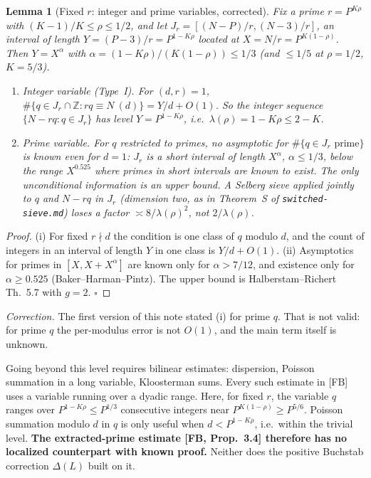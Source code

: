 \documentclass[11pt,a4paper]{article}
\newtheorem{lemma}[proposition]{Lemma}
\theoremstyle{remark}
\begin{document}
\begin{lemma}[Fixed $r$: integer and prime variables, corrected]
Fix a prime $r=P^{K\rho}$ with $(K-1)/K\le\rho\le1/2$, and let $J_r=[(N-P)/r,(N-3)/r]$, an interval of
length $Y=(P-3)/r=P^{1-K\rho}$ located at $X=N/r=P^{K(1-\rho)}$. Then $Y=X^{\alpha}$ with
$\alpha=(1-K\rho)/(K(1-\rho))\le1/3$ (and $\le 1/5$ at $\rho=1/2$, $K=5/3$).
\begin{enumerate}
\item[(i)] \emph{Integer variable (Type~I).} For $(d,r)=1$,
$\#\{q\in J_r\cap\mathbb Z: rq\equiv N\ (d)\}=Y/d+O(1)$. So the integer sequence $\{N-rq: q\in J_r\}$ has
level $Y=P^{1-K\rho}$, i.e.\ $\lambda(\rho)=1-K\rho\le2-K$.
\item[(ii)] \emph{Prime variable.} For $q$ restricted to primes, no asymptotic for
$\#\{q\in J_r \text{ prime}\}$ is known even for $d=1$: $J_r$ is a short interval of length $X^{\alpha}$,
$\alpha\le1/3$, below the range $X^{0.525}$ where primes in short intervals are known to exist.
The only unconditional information is an \emph{upper} bound. A Selberg sieve applied jointly to
$q$ and $N-rq$ in $J_r$ (dimension two, as in Theorem~S of \texttt{switched-sieve.md}) loses a factor
$\asymp 8/\lambda(\rho)^2$, not $2/\lambda(\rho)$.
\end{enumerate}
\end{lemma}
\begin{proof}
(i) For fixed $r\nmid d$ the condition is one class of $q$ modulo $d$, and the count of integers in an
interval of length $Y$ in one class is $Y/d+O(1)$. (ii) Asymptotics for primes in $[X,X+X^\alpha]$ are
known only for $\alpha>7/12$, and existence only for $\alpha\ge0.525$ (Baker--Harman--Pintz). The
upper bound is Halberstam--Richert Th.~5.7 with $g=2$. $\square$
\end{proof}
\noindent\emph{Correction.} The first version of this note stated (i) for prime $q$. That is not valid:
for prime $q$ the per-modulus error is not $O(1)$, and the main term itself is unknown.

Going beyond this level requires bilinear estimates: dispersion, Poisson summation in a long
variable, Kloosterman sums. Every such estimate in [FB] uses a variable running over a dyadic
range. Here, for fixed $r$, the variable $q$ ranges over $P^{1-K\rho}\le P^{1/3}$ consecutive
integers near $P^{K(1-\rho)}\ge P^{5/6}$. Poisson summation modulo $d$ in $q$ is only useful when
$d<P^{1-K\rho}$, i.e.\ within the trivial level.
\textbf{The extracted-prime estimate [FB, Prop.~3.4] therefore has no localized counterpart with
known proof.} Neither does the positive Buchstab correction $\Delta(L)$ built on it.
\end{document}
